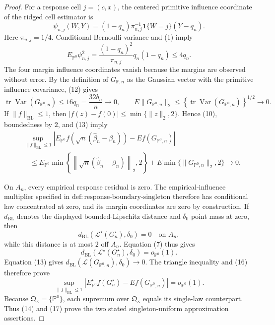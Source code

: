\documentclass{article}
\begin{document}
\begin{proof}
For a response cell \(j=(c,x)\), the centered primitive influence coordinate of the ridged cell estimator is
\[
\psi_{n,j}(W,Y)
=(1-q_n)\pi_{n,j}^{-1}\mathbf 1\{W=j\}(Y-q_n).
\tag{11}
\]
Here \(\pi_{n,j}=1/4\).  Conditional Bernoulli variance and (1) imply
\[
E_{\mathbb P^0}\psi_{n,j}^2
=\frac{(1-q_n)^2}{\pi_{n,j}}q_n(1-q_n)
\leq4q_n.
\tag{12}
\]
The four margin influence coordinates vanish because the margins are observed without error.  By the definition of \(G_{\mathbb P,n}\) as the Gaussian vector with the primitive influence covariance, (12) gives
\[
\operatorname{tr}\operatorname{Var}(G_{\mathbb P^0,n})
\leq16q_n=\frac{32b_n}{n}\longrightarrow0,
\qquad
E\lVert G_{\mathbb P^0,n}\rVert_2
\leq\left\{\operatorname{tr}\operatorname{Var}(G_{\mathbb P^0,n})\right\}^{1/2}
\longrightarrow0.
\tag{13}
\]
If \(\lVert f\rVert_{\mathrm{BL}}\leq1\), then \(|f(z)-f(0)|\leq\min\{\lVert z\rVert_2,2\}\).  Hence (10), boundedness by \(2\), and (13) imply
\[
\begin{split}
&\sup_{\lVert f\rVert_{\mathrm{BL}}\leq1}
\left|
E_{\mathbb P^0}f\!\left(\sqrt n(\widehat\beta_n-\beta_n)\right)
-Ef(G_{\mathbb P^0,n})
\right|\\
&\quad\leq
E_{\mathbb P^0}\min\!\left\{
\left\lVert\sqrt n(\widehat\beta_n-\beta_n)\right\rVert_2,2
\right\}
+E\min\{\lVert G_{\mathbb P^0,n}\rVert_2,2\}
\longrightarrow0.
\end{split}
\tag{14}
\]

On \(A_n\), every empirical response residual is zero.  The empirical-influence multiplier specified in \(\mathrm{def:response\text{-}boundary\text{-}singleton}\) therefore has conditional law concentrated at zero, and its margin coordinates are zero by construction.  If \(d_{\mathrm{BL}}\) denotes the displayed bounded-Lipschitz distance and \(\delta_0\) point mass at zero, then
\[
d_{\mathrm{BL}}\!\left(\mathcal L^\star(G_n^\star),\delta_0\right)=0
\quad\text{on }A_n,
\tag{15}
\]
while this distance is at most \(2\) off \(A_n\).  Equation (7) thus gives
\[
d_{\mathrm{BL}}\!\left(\mathcal L^\star(G_n^\star),\delta_0\right)
=o_{\mathbb P^0}(1).
\tag{16}
\]
Equation (13) gives \(d_{\mathrm{BL}}(\mathcal L(G_{\mathbb P^0,n}),\delta_0)\to0\).  The triangle inequality and (16) therefore prove
\[
\sup_{\lVert f\rVert_{\mathrm{BL}}\leq1}
\left|E_{\mathbb P^0}^{\star}f(G_n^\star)-Ef(G_{\mathbb P^0,n})\right|
=o_{\mathbb P^0}(1).
\tag{17}
\]
Because \(\mathfrak Q_{\kappa}=\{\mathbb P^0\}\), each supremum over \(\mathfrak Q_{\kappa}\) equals its single-law counterpart.  Thus (14) and (17) prove the two stated singleton-uniform approximation assertions.


\end{proof}
\end{document}

